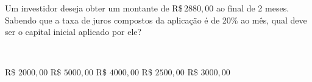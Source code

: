 \parbox{\linewidth}{

Um investidor deseja obter um montante de R\$\,$2880{,}00$ ao final de 2 meses. Sabendo que a taxa de juros compostos da aplicação é de 20\% ao mês, qual deve ser o capital inicial aplicado por ele?}
\vspace{2mm}
\\\parbox{\linewidth}{

R\$ $2000{,}00$
R\$ $5000{,}00$
R\$ $4000{,}00$
R\$ $2500{,}00$
R\$ $3000{,}00$

}

